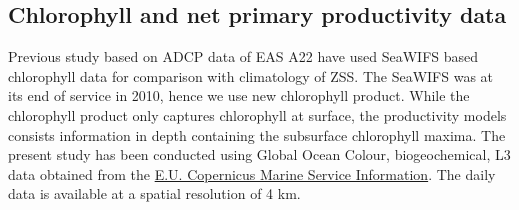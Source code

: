 \documentclass{article}
\begin{document}
	\subsection{Chlorophyll and net primary productivity data}
	Previous study based on ADCP data of EAS A22 have used SeaWIFS based chlorophyll data for comparison with climatology of ZSS. The SeaWIFS was at its end of service in 2010, hence we use new chlorophyll product. While the chlorophyll product only captures chlorophyll at surface, the productivity models consists information in depth containing the subsurface chlorophyll maxima. The present study has been conducted using Global Ocean Colour, biogeochemical, L3 data obtained from the  \href{https://doi.org/10.48670/moi-00280}{E.U. Copernicus Marine Service Information}. The daily data is available at a spatial resolution of 4 km. 

	
\end{document}
